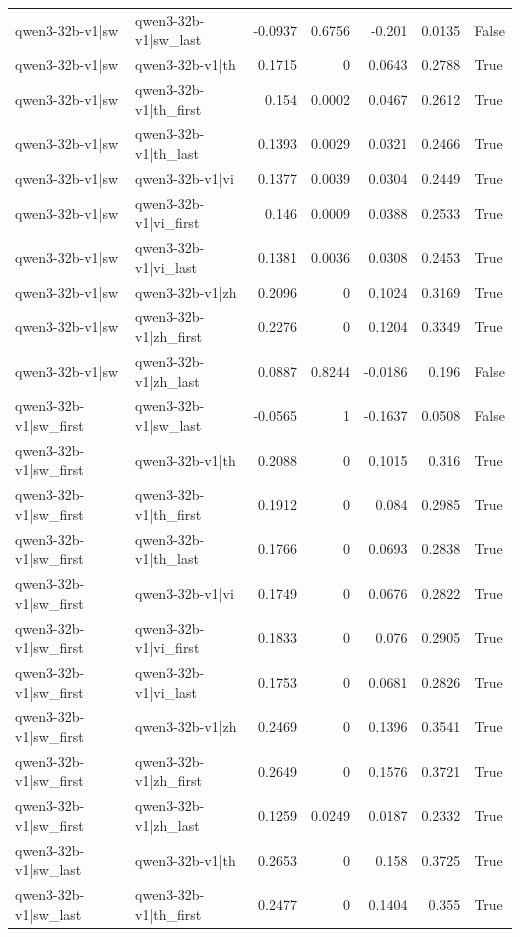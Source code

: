 \begin{table}
\begin{tabular}{l l r r r r l}
qwen3-32b-v1|sw & qwen3-32b-v1|sw_last & -0.0937 & 0.6756 & -0.201 & 0.0135 & False \\
qwen3-32b-v1|sw & qwen3-32b-v1|th & 0.1715 & 0 & 0.0643 & 0.2788 & True \\
qwen3-32b-v1|sw & qwen3-32b-v1|th_first & 0.154 & 0.0002 & 0.0467 & 0.2612 & True \\
qwen3-32b-v1|sw & qwen3-32b-v1|th_last & 0.1393 & 0.0029 & 0.0321 & 0.2466 & True \\
qwen3-32b-v1|sw & qwen3-32b-v1|vi & 0.1377 & 0.0039 & 0.0304 & 0.2449 & True \\
qwen3-32b-v1|sw & qwen3-32b-v1|vi_first & 0.146 & 0.0009 & 0.0388 & 0.2533 & True \\
qwen3-32b-v1|sw & qwen3-32b-v1|vi_last & 0.1381 & 0.0036 & 0.0308 & 0.2453 & True \\
qwen3-32b-v1|sw & qwen3-32b-v1|zh & 0.2096 & 0 & 0.1024 & 0.3169 & True \\
qwen3-32b-v1|sw & qwen3-32b-v1|zh_first & 0.2276 & 0 & 0.1204 & 0.3349 & True \\
qwen3-32b-v1|sw & qwen3-32b-v1|zh_last & 0.0887 & 0.8244 & -0.0186 & 0.196 & False \\
qwen3-32b-v1|sw_first & qwen3-32b-v1|sw_last & -0.0565 & 1 & -0.1637 & 0.0508 & False \\
qwen3-32b-v1|sw_first & qwen3-32b-v1|th & 0.2088 & 0 & 0.1015 & 0.316 & True \\
qwen3-32b-v1|sw_first & qwen3-32b-v1|th_first & 0.1912 & 0 & 0.084 & 0.2985 & True \\
qwen3-32b-v1|sw_first & qwen3-32b-v1|th_last & 0.1766 & 0 & 0.0693 & 0.2838 & True \\
qwen3-32b-v1|sw_first & qwen3-32b-v1|vi & 0.1749 & 0 & 0.0676 & 0.2822 & True \\
qwen3-32b-v1|sw_first & qwen3-32b-v1|vi_first & 0.1833 & 0 & 0.076 & 0.2905 & True \\
qwen3-32b-v1|sw_first & qwen3-32b-v1|vi_last & 0.1753 & 0 & 0.0681 & 0.2826 & True \\
qwen3-32b-v1|sw_first & qwen3-32b-v1|zh & 0.2469 & 0 & 0.1396 & 0.3541 & True \\
qwen3-32b-v1|sw_first & qwen3-32b-v1|zh_first & 0.2649 & 0 & 0.1576 & 0.3721 & True \\
qwen3-32b-v1|sw_first & qwen3-32b-v1|zh_last & 0.1259 & 0.0249 & 0.0187 & 0.2332 & True \\
qwen3-32b-v1|sw_last & qwen3-32b-v1|th & 0.2653 & 0 & 0.158 & 0.3725 & True \\
qwen3-32b-v1|sw_last & qwen3-32b-v1|th_first & 0.2477 & 0 & 0.1404 & 0.355 & True \\

\end{tabular}
\end{table}
